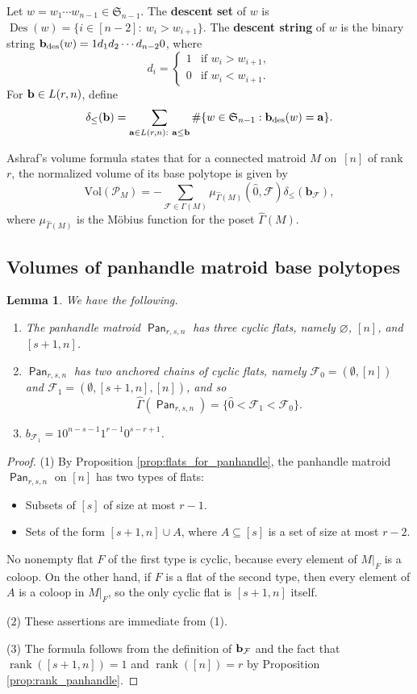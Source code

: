 \documentclass[11pt]{amsart}
\newtheorem{lemma}[theorem]{Lemma}
\theoremstyle{definition}
\newcommand{\0}{\emptyset}
\newcommand{\F}{\mathcal{F}}
\newcommand{\Po}{\mathcal{P}}
\newcommand{\Vol}{\mathrm{Vol}}
\DeclareMathOperator{\des}{des}
\DeclareMathOperator{\Des}{Des}
\newcommand{\defterm}[1]{\textbf{#1}}
\DeclareMathOperator{\Pan}{\mathsf{Pan}} %
\DeclareMathOperator{\rank}{\operatorname{rank}}
\newcommand{\Sym}{\mathfrak{S}}
\begin{document}
Let $w=w_1\cdots w_{n-1}\in\Sym_{n-1}$.  The \defterm{descent set} of $w$ is $\Des(w)=\{i\in[n-2]:\ w_i>w_{i+1}\}$.  The \defterm{descent string} of $w$ is the binary string  $ \bb_{\des} (w) = 1d_1d_2 \cdots d_{n-2} 0$, where
\[
	d_{i} = \begin{cases}
		1 &\text{if } w_i > w_{i+1},\\
		0 &\text{if } w_i < w_{i+1}.
	\end{cases}
\]
For $ \mathbf{b} \in L(r,n) $,  define
\[
\delta_{\leq}(\bb) = \sum_{\aa\in L(r,n):\ \aa \leq \bb } \#\{w\in\Sym_{n-1} : \bb_{\des}(w) = \aa\}.
\]

Ashraf's volume formula \cite[Theorem~1.1]{Ashraf} states that for a connected matroid $M$ on~$[n]$ of rank~$r$, the normalized volume of its base polytope is given by
\begin{equation}
\label{AshrafThm}
	\Vol(\Po_{M}) = -\sum_{\F\in\Gamma(M)} \mu_{\hat\Gamma(M)}(\hat0,\F) \delta_{\leq}(\mathbf{b}_{\F}),
\end{equation}
where $\mu_{\hat\Gamma(M)}$ is the  M\"obius function for the poset $\hat\Gamma(M)$.


\subsection{Volumes of panhandle matroid base polytopes}

\begin{lemma}\label{lem:CycFlatsPan}
We have the following.
\begin{enumerate}
\item The panhandle matroid $\Pan_{r,s,n}$ has three cyclic flats, namely $\varnothing$, $[n]$, and $[s+1,n]$.
\item $\Pan_{r,s,n}$ has two anchored chains of cyclic flats, namely
$\F_0=(\0,[n])$ and $\F_1=(\0,[s+1,n],[n])$, and so
\[
\hat{\Gamma}(\Pan_{r,s,n}) =
\{ \hat{0} < \F_1 < \F_0 \}.
\]
\item $b_{\F_1} = 1 0^{n-s-1} 1^{r-1} 0^{s-r+1}$.
\end{enumerate}
\end{lemma}

\begin{proof}
(1) By Proposition \ref{prop:flats_for_panhandle}, the panhandle matroid $\Pan_{r,s,n}$ on $[n]$ has two types of flats:
\begin{itemize}
	\item Subsets of $ [s] $ of size at most $ r-1 $.
	\item Sets of the form $ [s+1,n] \cup A $, where $ A \subseteq [s] $ is a set of size at most $ r-2 $.
\end{itemize}
No nonempty flat $F$ of the first type is cyclic, because every element of $M|_F$ is a coloop.
On the other hand, if $F$ is a flat of the second type, then every element of $ A $ is a coloop in $M|_F$, so the only cyclic flat is $ [s+1, n] $ itself.

(2) These assertions are immediate from (1).

(3) The formula follows from the definition of $\bb_\F$ and the fact that $\rank([s+1,n]) = 1 $ and $\rank([n]) = r $ by Proposition \ref{prop:rank_panhandle}.
\end{proof}
\end{document}
